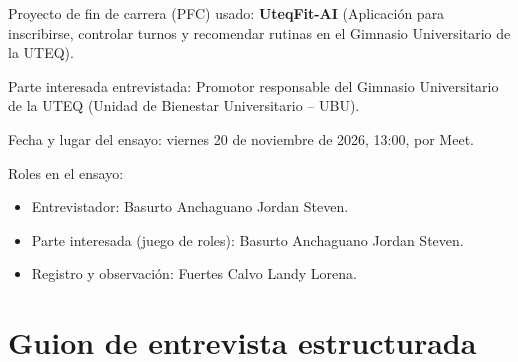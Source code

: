 \documentclass[12pt,a4paper]{article}
\begin{document}
Proyecto de fin de carrera (PFC) usado: \textbf{UteqFit-AI} (Aplicación para inscribirse, controlar turnos y recomendar rutinas en el Gimnasio Universitario de la UTEQ).

Parte interesada entrevistada: Promotor responsable del Gimnasio Universitario de la UTEQ (Unidad de Bienestar Universitario -- UBU).

Fecha y lugar del ensayo: viernes 20 de noviembre de 2026, 13:00, por Meet.

Roles en el ensayo:
\begin{itemize}[noitemsep]
    \item Entrevistador: {Basurto Anchaguano Jordan Steven}.
    \item Parte interesada (juego de roles): Basurto Anchaguano Jordan Steven.
    \item Registro y observación: {Fuertes Calvo Landy Lorena}.
\end{itemize}

\section{Guion de entrevista estructurada}

\end{document}
